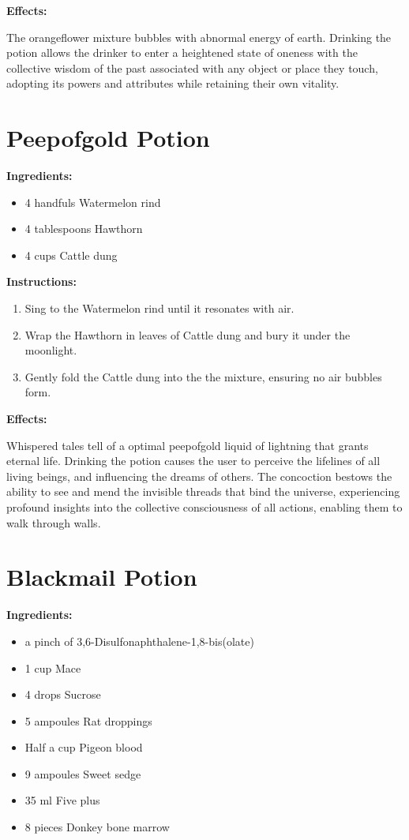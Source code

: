 \documentclass{article}
\begin{document}
\textbf{Effects:}

The orangeflower mixture bubbles with abnormal energy of earth. Drinking the potion allows the drinker to enter a heightened state of oneness with the collective wisdom of the past associated with any object or place they touch, adopting its powers and attributes while retaining their own vitality.

\newpage
\section*{Peepofgold Potion}

\textbf{Ingredients:}

\begin{itemize}
  \item 4 handfuls Watermelon rind
  \item 4 tablespoons Hawthorn
  \item 4 cups Cattle dung
\end{itemize}

\textbf{Instructions:}

\begin{enumerate}
  \item Sing to the Watermelon rind until it resonates with air.
  \item Wrap the Hawthorn in leaves of Cattle dung and bury it under the moonlight.
  \item Gently fold the Cattle dung into the the mixture, ensuring no air bubbles form.
\end{enumerate}

\textbf{Effects:}

Whispered tales tell of a optimal peepofgold liquid of lightning that grants eternal life. Drinking the potion causes the user to perceive the lifelines of all living beings, and influencing the dreams of others. The concoction bestows the ability to see and mend the invisible threads that bind the universe, experiencing profound insights into the collective consciousness of all actions, enabling them to walk through walls.

\newpage
\section*{Blackmail Potion}

\textbf{Ingredients:}

\begin{itemize}
  \item a pinch of 3,6-Disulfonaphthalene-1,8-bis(olate)
  \item 1 cup Mace
  \item 4 drops Sucrose
  \item 5 ampoules Rat droppings
  \item Half a cup Pigeon blood
  \item 9 ampoules Sweet sedge
  \item 35 ml Five plus
  \item 8 pieces Donkey bone marrow
\end{itemize}
\end{document}
